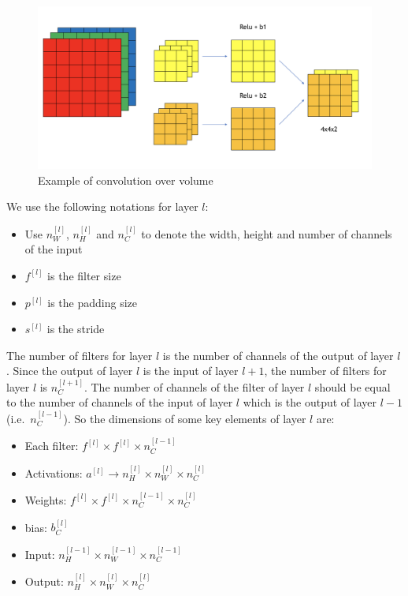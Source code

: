 \documentclass[
  12pt,
]{krantz}
\providecommand{\tightlist}{%
  \setlength{\itemsep}{0pt}\setlength{\parskip}{0pt}}
\begin{document}
\begin{figure}

{\centering \includegraphics[width=0.7\linewidth]{images/ConvOverVolume} 

}

\caption{Example of convolution over volume}\label{fig:ConvOverVolume}
\end{figure}

We use the following notations for layer \(l\):

\begin{itemize}
\tightlist
\item
  Use \(n_W^{[l]}\), \(n_H^{[l]}\) and \(n_C^{[l]}\) to denote the width, height and number of channels of the input
\item
  \(f^{[l]}\) is the filter size
\item
  \(p^{[l]}\) is the padding size
\item
  \(s^{[l]}\) is the stride
\end{itemize}

The number of filters for layer \(l\) is the number of channels of the output of layer \(l\). Since the output of layer \(l\) is the input of layer \(l+1\), the number of filters for layer \(l\) is \(n_C^{[l+1]}\). The number of channels of the filter of layer \(l\) should be equal to the number of channels of the input of layer \(l\) which is the output of layer \(l-1\) (i.e.~\(n_C^{[l-1]}\)). So the dimensions of some key elements of layer \(l\) are:

\begin{itemize}
\tightlist
\item
  Each filter: \(f^{[l]} \times f^{[l]} \times n^{[l-1]}_C\)
\item
  Activations: \(a^{[l]} \rightarrow n_H^{[l]} \times n_W^{[l]} \times n_C^{[l]}\)
\item
  Weights: \(f^{[l]} \times f^{[l]} \times n^{[l-1]}_C \times n^{[l]}_C\)
\item
  bias: \(b^{[l]}_C\)
\item
  Input: \(n^{[l-1]}_H \times n^{[l-1]}_W \times n^{[l-1]}_C\)
\item
  Output: \(n^{[l]}_H \times n^{[l]}_W \times n^{[l]}_C\)
\end{itemize}
\end{document}
